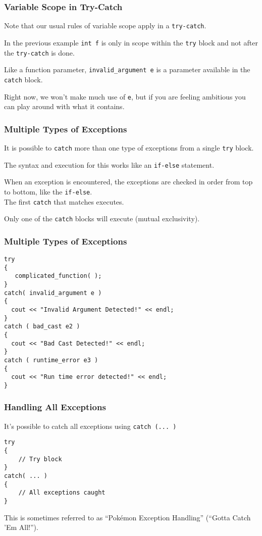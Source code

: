 \begin{frame}
\frametitle{Variable Scope in Try-Catch}

Note that our usual rules of variable scope apply in a \texttt{try-catch}.

In the previous example \texttt{int f} is only in scope within the \texttt{try} block and not after the \texttt{try-catch} is done.

Like a function parameter, \texttt{invalid\_argument e} is a parameter available in the \texttt{catch} block.

Right now, we won't make much use of \texttt{e}, but if you are feeling ambitious you can play around with what it contains.

\end{frame}

\begin{frame}
\frametitle{Multiple Types of Exceptions}

It is possible to \texttt{catch} more than one type of exceptions from a single \texttt{try} block.

The syntax and execution for this works like an \texttt{if-else} statement.

When an exception is encountered, the exceptions are checked in order from top to bottom, like the \texttt{if-else}.\\
\quad The first \texttt{catch} that matches executes.

Only one of the \texttt{catch} blocks will execute (mutual exclusivity).

\end{frame}

\begin{frame}[fragile]
\frametitle{Multiple Types of Exceptions}


\begin{verbatim}
try
{
   complicated_function( );
}
catch( invalid_argument e )
{
  cout << "Invalid Argument Detected!" << endl;
}
catch ( bad_cast e2 )
{
  cout << "Bad Cast Detected!" << endl;
}
catch ( runtime_error e3 )
{
  cout << "Run time error detected!" << endl;
}
\end{verbatim}


\end{frame}

\begin{frame}[fragile]
\frametitle{Handling All Exceptions}

It's possible to catch all exceptions using \texttt{catch (... )}

\begin{verbatim}
try
{
    // Try block
}
catch( ... )
{
    // All exceptions caught
}
\end{verbatim}

This is sometimes referred to as ``Pok\'emon Exception Handling'' (``Gotta Catch 'Em All!'').

\end{frame}




